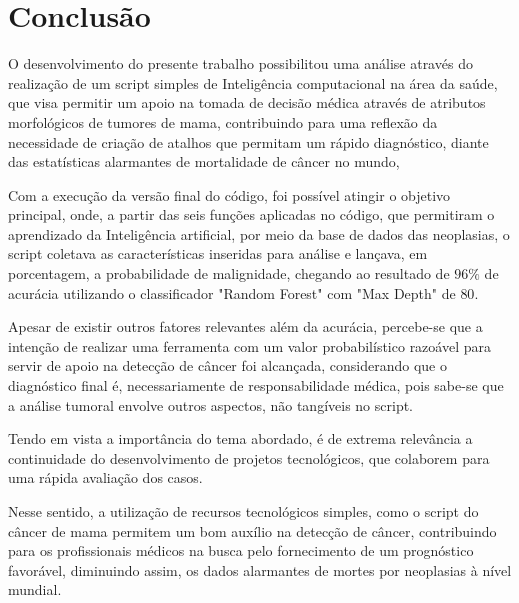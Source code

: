 \chapter{Conclusão}
\label{chapter:conclusao}

O desenvolvimento do presente trabalho possibilitou uma análise através do realização de um script simples de Inteligência computacional
na área da saúde, que visa permitir um apoio na tomada de decisão médica através de atributos morfológicos de tumores de mama,
contribuindo para uma reflexão da necessidade de criação de atalhos que permitam um rápido diagnóstico,
diante das estatísticas alarmantes de mortalidade de câncer no mundo,

Com a execução da versão final do código, foi possível atingir o objetivo principal,
onde, a partir das seis funções aplicadas no código, que permitiram o aprendizado da Inteligência artificial,
por meio da base de dados das neoplasias, o script coletava as características inseridas para análise e lançava, em porcentagem,
a probabilidade de malignidade,
chegando ao resultado de $96\%$ de acurácia
utilizando o classificador "Random Forest" com "Max Depth" de $80$.


Apesar de existir outros fatores relevantes além da acurácia,
percebe-se que a intenção de realizar uma ferramenta com um valor probabilístico razoável para servir de apoio na detecção de câncer foi alcançada,
considerando que o diagnóstico final é, necessariamente de responsabilidade médica,
pois sabe-se que a análise tumoral envolve outros aspectos, não tangíveis no script.

Tendo em vista a importância do tema abordado, é de extrema relevância a continuidade do desenvolvimento de projetos tecnológicos,
que colaborem para uma rápida avaliação dos casos.

Nesse sentido, a utilização de recursos tecnológicos simples, como o script do câncer de mama permitem um bom auxílio na detecção de câncer,
contribuindo para os profissionais médicos na busca pelo fornecimento de um prognóstico favorável,
diminuindo assim, os dados alarmantes de mortes por neoplasias à nível mundial.
